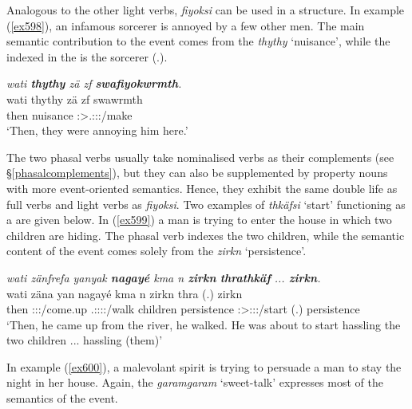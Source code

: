 Analogous to the other light verbs, \emph{fiyoksi} can be used in a  structure. In example (\ref{ex598}), an infamous sorcerer is annoyed by a few other men. The main semantic contribution to the event comes from the  \emph{thythy} `nuisance', while the  indexed in the  is the sorcerer (\Tsg.\Masc).

\begin{exe}
	\ex \emph{wati \textbf{thythy} zä zf \textbf{swafiyokwrmth}.}\\
	\gll wati thythy zä zf swawrmth\\
	then nuisance \Prox{} \Imm{} \Stpl:\Sbj>\Tsg.\Masc:\Obj:\Pst:\Dur/make\\
	\trans `Then, they were annoying him here.'
	\label{ex598}
\end{exe}

The two phasal verbs usually take nominalised verbs as their complements (see \S{}\ref{phasalcomplements}), but they can also be supplemented by property nouns with more event-oriented semantics. Hence, they exhibit the same double life as full verbs and light verbs as \emph{fiyoksi}. Two examples of \emph{thkäfsi} `start' functioning as a  are given below. In (\ref{ex599}) a man is trying to enter the house in which two children are hiding. The phasal verb indexes the two children, while the semantic content of the event comes solely from the  \emph{zirkn} `persistence'.

\begin{exe}
	\ex \emph{wati zänfrefa yanyak \textbf{nagayé} kma n \textbf{zirkn} \textbf{thrathkäf} ... \textbf{zirkn}.}\\
	\gll wati zäna yan nagayé kma n zirkn thra (.) zirkn\\
	then \Sg:\Sbj:\Pst:\Pfv/come.up \Tsg.\Masc:\Sbj:\Nonpast:\Ipfv:\Venit/walk children \Pot{} \Imn{} persistence \Stsg:\Sbj>\Stdu:\Obj:\Irr:\Pfv/start (.) persistence\\
	\trans `Then, he came up from the river, he walked. He was about to start hassling the two children ... hassling (them)'
	\label{ex599}
\end{exe}

In example (\ref{ex600}), a malevolant spirit is trying to persuade a man to stay the night in her house. Again, the  \emph{garamgaram} `sweet-talk' expresses most of the semantics of the event.

